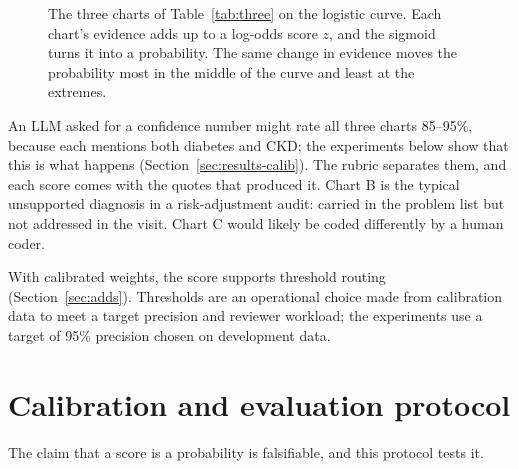 \documentclass[10pt,letterpaper]{article}
\begin{document}
\begin{figure}[!htbp]
\centering
{}
\caption{The three charts of Table~\ref{tab:three} on the logistic curve. Each chart's evidence adds up to a log-odds score $z$, and the sigmoid turns it into a probability. The same change in evidence moves the probability most in the middle of the curve and least at the extremes.}\label{fig:logistic}
\end{figure}

An LLM asked for a confidence number might rate all three charts 85--95\%, because each mentions both diabetes and CKD; the experiments below show that this is what happens (Section~\ref{sec:results-calib}). The rubric separates them, and each score comes with the quotes that produced it. Chart B is the typical unsupported diagnosis in a risk-adjustment audit: carried in the problem list but not addressed in the visit. Chart C would likely be coded differently by a human coder.

With calibrated weights, the score supports threshold routing (Section~\ref{sec:adds}). Thresholds are an operational choice made from calibration data to meet a target precision and reviewer workload; the experiments use a target of 95\% precision chosen on development data.

\section{Calibration and evaluation protocol}\label{sec:protocol}

The claim that a score is a probability is falsifiable, and this protocol tests it.
\end{document}
